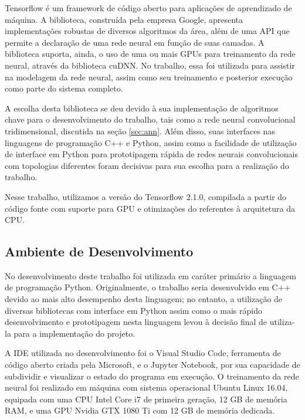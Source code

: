 Tensorflow\cite{tensorflow2015-whitepaper} é um framework de código aberto para aplicações de aprendizado de máquina.
A biblioteca, construída pela empresa Google, apresenta implementações robustas de diversos algoritmos da área, além de uma API que permite a declaração de uma rede neural em função de suas camadas.
A biblioteca suporta, ainda, o uso de uma ou mais GPUs para treinamento da rede neural, através da biblioteca cuDNN. No trabalho, essa foi utilizada para assistir na modelagem da rede neural, assim como seu treinamento e posterior execução como parte do sistema completo.

A escolha desta biblioteca se deu devido à sua implementação de algoritmos chave para o desenvolvimento do trabalho, tais como a rede neural convolucional tridimensional, discutida na seção \ref{sec:ann}.
Além disso, suas interfaces nas linguagens de programação C++ e Python, assim como a facilidade de utilização de interface em Python para prototipagem rápida de redes neurais convolucionais com topologias diferentes foram decisivas para sua escolha para a realização do trabalho.

Nesse trabalho, utilizamos a versão do Tensorflow 2.1.0, compilada a partir do código fonte com suporte para GPU e otimizações do referentes à arquitetura da CPU.

\subsection{Ambiente de Desenvolvimento}
\label{subsec:environ}

No desenvolvimento deste trabalho foi utilizada em caráter primário a linguagem de programação Python.
Originalmente, o trabalho seria desenvolvido em C++ devido ao mais alto desempenho desta linguagem; no entanto, a utilização de diversas bibliotecas com interface em Python assim como o mais rápido desenvolvimento e prototipagem nesta linguagem levou à decisão final de utiliza-la para a implementação do projeto.

A IDE utilizada no desenvolvimento foi o Visual Studio Code, ferramenta de código aberto criada pela Microsoft, e o Jupyter Notebook\cite{kluyverJupyterNotebooksPublishing2016}, por sua capacidade de subdividir e visualizar o estado do programa em execução.
O treinamento da rede neural foi realizado em máquina com sistema operacional Ubuntu Linux 16.04, equipada com uma CPU Intel Core i7 de primeira geração, 12 GB de memória RAM, e uma GPU Nvidia GTX 1080 Ti com 12 GB de memória dedicada.

